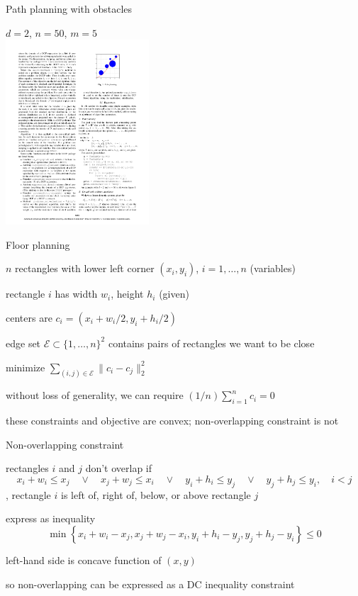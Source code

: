 \documentclass[aspectratio=169,11pt]{beamer}
\begin{document}
\begin{frame}[fragile]{Path planning with obstacles}
\begin{center}
$d=2$, $n=50$, $m=5$ \\
\includegraphics[width=0.4\textwidth]{path_planning.pdf}
\end{center}
\end{frame}

\begin{frame}{Floor planning}
\BIT
\item $n$ rectangles with lower left corner $(x_i, y_i)$, $i=1,\ldots, n$ (variables)
\item rectangle $i$ has width $w_i$, height $h_i$ (given)
\item centers are $c_i = (x_i+w_i/2, y_i + h_i/2)$
\item edge set $\mathcal{E} \subset \{1,\ldots, n\}^2$ 
contains pairs of rectangles we want to be close
\item minimize $\sum_{(i,j)\in \mathcal E} \|c_i - c_j\|_2^2$
\item without loss of generality, we can require
$(1/n)\sum_{i=1}^{n} c_i = 0$
\item these constraints and objective are convex; non-overlapping constraint is not
\EIT
\end{frame}

\begin{frame}{Non-overlapping constraint}
\BIT
\item rectangles $i$ and $j$ don't overlap if
\[
x_i + w_i \leq x_j \quad \lor \quad x_j + w_j \leq x_i \quad \lor \quad
y_i + h_i \leq y_j \quad \lor \quad y_j + h_j \leq y_i, \quad i < j
\]
\ie, rectangle $i$ is left of, right of, below, or above rectangle $j$
\item express as inequality
\[
\min \left\{x_i+w_i-x_j, x_j+w_j-x_i, y_i+h_i-y_j, y_j+h_j-y_i\right\} \leq 0
\]
\item left-hand side is concave function of $(x,y)$
\item so non-overlapping can be expressed as a DC inequality constraint
\EIT
\end{frame}
\end{document}
